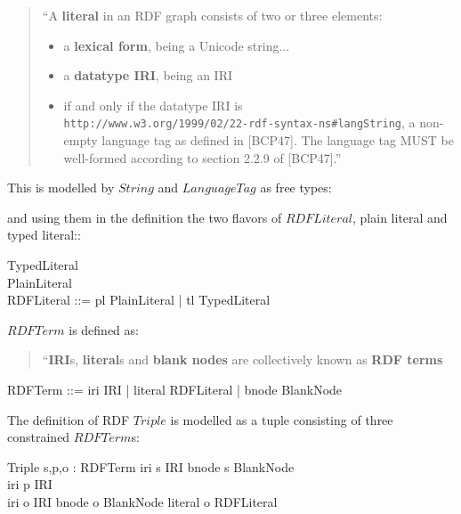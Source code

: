 \documentclass[fuzz]{llncs}
\def\entryFor{\cdot}
\begin{document}
\begin{quote}
``A \textbf{literal} in an RDF graph consists of two or three elements:
\begin{itemize}
\item a \textbf{lexical form}, being a Unicode string...
\item a \textbf{datatype IRI}, being an IRI
\item if and only if the datatype IRI is \\
\verb|http://www.w3.org/1999/02/22-rdf-syntax-ns#langString|, a non-empty language tag as defined in [BCP47]\cite{BCP47}. The language tag MUST be well-formed according to section 2.2.9 of [BCP47]\cite{BCP47}.''
\end{itemize}
\end{quote}
This is modelled by $String$ and $LanguageTag$ as free types:
\begin{zed}
\end{zed}
and using them in the definition the two flavors of $RDFLiteral$,  plain literal and typed literal::
\begin{zed}
TypedLiteral  \\
PlainLiteral  \\
RDFLiteral ::= pl \ldata PlainLiteral \rdata | tl \ldata TypedLiteral \rdata \\ 
\end{zed}
$RDFTerm$ is defined as:
\begin{quote}
``\textbf{IRI}s, \textbf{literal}s and \textbf{blank nodes} are collectively known as \textbf{RDF terms}
\end{quote}

\begin{zed}
RDFTerm ::= iri \ldata IRI \rdata | literal \ldata RDFLiteral \rdata | bnode \ldata BlankNode \rdata
\end{zed}
The definition of RDF $Triple$ is modelled as a tuple consisting of three constrained $RDFTerm$s:
\begin{schema}{Triple}
   s,p,o : RDFTerm
\where
   iri \entryFor s \in IRI \lor bnode \entryFor s \in BlankNode \\
   iri \entryFor p \in IRI \\
   iri \entryFor o \in IRI \lor bnode \entryFor o \in BlankNode \lor literal \entryFor o \in RDFLiteral
\end{schema}
\end{document}
